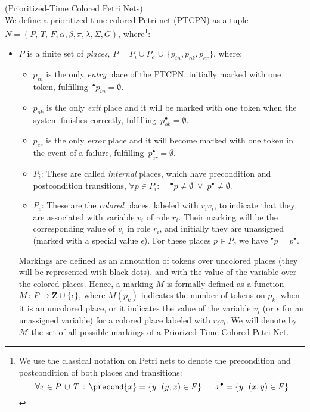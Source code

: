 {\bdfn (Prioritized-Time Colored Petri Nets)\\
We define a prioritized-time colored Petri net (PTCPN) as a tuple
\linebreak $N=(P,\,T,\,F,\alpha,\beta,\pi,\lambda,\Sigma, G)$,
where\footnote{We use the classical notation on Petri nets to denote the
precondition and postcondition of both places and transitions:
%
\[ \forall x \in P\,\cup\,T\,:\,
\precond{x} = \{ y \,|\, (y,x) \in F\}~~~~~
   x^{\bullet} = \{ y \,|\, (x,y) \in F\}
\] }:
\begin{itemize}
  \item $P$ is a finite set of {\em places},  $P= P_i \cup P_c\, 
        \cup\, \{p_{in}, p_{ok}, p_{er} \}$,
  where:
  \begin{itemize}
    \item $p_{in}$ is the only {\it entry} place of the PTCPN, initially 
          marked with one
          token, fulfilling $\,^\bullet p_{in} = \emptyset$.
%
    \item $p_{ok}$  is the only {\it exit} place and it will be 
          marked with one token  when the system
          finishes correctly, fulfilling $ \, p_{ok}^\bullet = \emptyset$.
    \item  $p_{er}$ is the only {\it error} place and it will 
           become marked with one token in the event of a failure,
           fulfilling
           $ \, p_{er}^\bullet = \emptyset $.
%
    \item $P_i$:  These are called {\it internal} places, which have
    precondition and postcondition transitions, $\forall p\in
    P_i:\quad \,^\bullet p \neq \emptyset \; \vee \; p^\bullet \neq \emptyset
    $.
    \item  $P_c$: These are the {\it colored}  places,  labeled with $r_iv_i$,
    to indicate that they are associated  with  variable
    $v_i$ of role $r_i$. Their marking will be the corresponding
    value of $v_i$ in role $r_i$, and initially  they are unassigned
    (marked with a special value $\epsilon$). For these places $p\in
    P_c$ we have $^\bullet p= p^\bullet$.
   \end{itemize}

Markings are defined  as an annotation of tokens over uncolored
places (they will be represented with black dots), and with the
value of the variable over the colored places. Hence, a marking $M$
is formally defined as a function \linebreak \mbox{$M\,:\,P
\rightarrow \mathbf{Z}\cup\{\epsilon\}$,} where $M(p_k)$ indicates
the number of tokens on $p_k$, when it is an uncolored place, or it
indicates the value of the variable $v_i$ (or $\epsilon$ for an
unassigned variable) for a colored place labeled with $r_iv_i$. We
will denote by $\mathcal{M}$ the set of all possible markings of a
Priorized-Time Colored Petri Net.


\end{itemize}}
